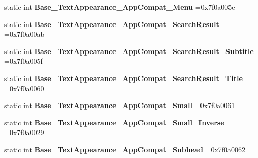 \begin{DoxyCompactItemize}
\mbox{\label{classandroid_1_1support_1_1design_1_1R_1_1style_a1b376b1afd598fa6a2c028e16ab1cdf0}} 
static int {\bfseries Base\+\_\+\+Text\+Appearance\+\_\+\+App\+Compat\+\_\+\+Menu} =0x7f0a005e
\item 
\mbox{\label{classandroid_1_1support_1_1design_1_1R_1_1style_aea37ba4f6cf7478309e40357bd0980a0}} 
static int {\bfseries Base\+\_\+\+Text\+Appearance\+\_\+\+App\+Compat\+\_\+\+Search\+Result} =0x7f0a00ab
\item 
\mbox{\label{classandroid_1_1support_1_1design_1_1R_1_1style_af08c6aafe5223b67b69ef229d94a1238}} 
static int {\bfseries Base\+\_\+\+Text\+Appearance\+\_\+\+App\+Compat\+\_\+\+Search\+Result\+\_\+\+Subtitle} =0x7f0a005f
\item 
\mbox{\label{classandroid_1_1support_1_1design_1_1R_1_1style_a8fbd6ac2c9bb9d4d2b73e68e9ed2e8c5}} 
static int {\bfseries Base\+\_\+\+Text\+Appearance\+\_\+\+App\+Compat\+\_\+\+Search\+Result\+\_\+\+Title} =0x7f0a0060
\item 
\mbox{\label{classandroid_1_1support_1_1design_1_1R_1_1style_ad899b6f44d42395e23662375acd8313d}} 
static int {\bfseries Base\+\_\+\+Text\+Appearance\+\_\+\+App\+Compat\+\_\+\+Small} =0x7f0a0061
\item 
\mbox{\label{classandroid_1_1support_1_1design_1_1R_1_1style_afb30c1e06b14e5d37da259b8024f8532}} 
static int {\bfseries Base\+\_\+\+Text\+Appearance\+\_\+\+App\+Compat\+\_\+\+Small\+\_\+\+Inverse} =0x7f0a0029
\item 
\mbox{\label{classandroid_1_1support_1_1design_1_1R_1_1style_a0bb4241a51a783011c73a07f751b1208}} 
static int {\bfseries Base\+\_\+\+Text\+Appearance\+\_\+\+App\+Compat\+\_\+\+Subhead} =0x7f0a0062
\item 
\mbox{\label{classandroid_1_1support_1_1design_1_1R_1_1style_afb7c8e6d7c1a922cd08987f78d14bbb2}} 

\end{DoxyCompactItemize}
